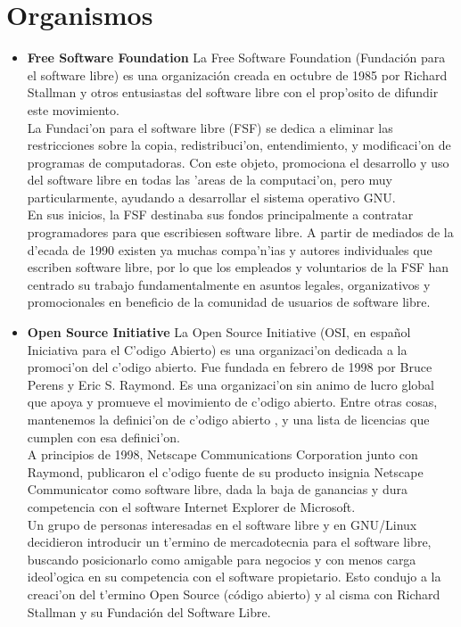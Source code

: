 \section{Organismos}
\begin{itemize}
     	\item {\bf Free Software Foundation }
La Free Software Foundation (Fundación para el software libre) es una organización creada en octubre de 1985 por Richard Stallman y otros entusiastas del software libre con el prop'osito de difundir este movimiento.\\La Fundaci'on para el software libre (FSF) se dedica a eliminar las restricciones sobre la copia, redistribuci'on, entendimiento, y modificaci'on de programas de computadoras. Con este objeto, promociona el desarrollo y uso del software libre en todas las 'areas de la computaci'on, pero muy particularmente, ayudando a desarrollar el sistema operativo GNU.\\En sus inicios, la FSF destinaba sus fondos principalmente a contratar programadores para que escribiesen software libre. A partir de mediados de la d'ecada de 1990 existen ya muchas compa'n'ias y autores individuales que escriben software libre, por lo que los empleados y voluntarios de la FSF han centrado su trabajo fundamentalmente en asuntos legales, organizativos y promocionales en beneficio de la comunidad de usuarios de software libre.
	\item {\bf Open Source Initiative}
La Open Source Initiative (OSI, en español Iniciativa para el C'odigo Abierto) es una organizaci'on dedicada a la promoci'on del c'odigo abierto. Fue fundada en febrero de 1998 por Bruce Perens y Eric S. Raymond. Es una organizaci'on sin animo de lucro global que apoya y promueve el movimiento de c'odigo abierto. Entre otras cosas, mantenemos la definici'on de c'odigo abierto , y una lista de licencias que cumplen con esa definici'on.\\A principios de 1998, Netscape Communications Corporation junto con Raymond, publicaron el c'odigo fuente de su producto insignia Netscape Communicator como software libre, dada la baja de ganancias y dura competencia con el software Internet Explorer de Microsoft.\\Un grupo de personas interesadas en el software libre y en GNU/Linux decidieron introducir un t'ermino de mercadotecnia para el software libre, buscando posicionarlo como amigable para negocios y con menos carga ideol'ogica en su competencia con el software propietario. Esto condujo a la creaci'on del t'ermino Open Source (código abierto) y al cisma con Richard Stallman y su Fundación del Software Libre.

\end{itemize}
